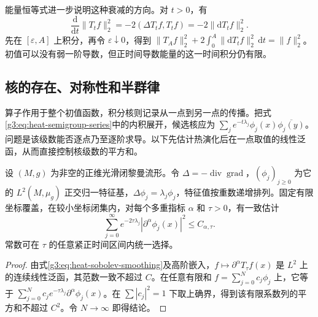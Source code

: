 能量恒等式进一步说明这种衰减的方向。对 \(t>0\)，有
\begin{equation}\label{g3:eq:heat-energy-dissipation}
	\frac{\mathrm d}{\mathrm dt}\|T_tf\|_2^2
	=-2(\Delta T_tf,T_tf)=-2\|\mathrm dT_tf\|_2^2.
\end{equation}
先在 \([\varepsilon,A]\) 上积分，再令 \(\varepsilon\downarrow0\)，得到 \(\|T_Af\|_2^2+2\int_0^A\|\mathrm dT_tf\|_2^2\,\mathrm dt=\|f\|_2^2\)。初值可以没有弱一阶导数，但正时间导数能量的这一时间积分仍有限。

\subsection{核的存在、对称性和半群律}
\label{g3:subsec:1601:03}

算子作用于整个初值函数，积分核则记录从一点到另一点的传播。把式\eqref{g3:eq:heat-semigroup-series}中的内积展开，候选核应为 \(\sum_j e^{-t\lambda_j}\phi_j(x)\overline{\phi_j(y)}\)。问题是该级数能否逐点乃至逐阶求导。以下先估计热演化后在一点取值的线性泛函，从而直接控制核级数的平方和。

\begin{lemma}\label{g3:lem:heat-evaluation-square-sum}
	设 \((M,g)\) 为非空的正维光滑闭黎曼流形。令 \(\Delta=-\operatorname{div}\operatorname{grad}\)，\((\phi_j)_{j\ge0}\) 为它的 \(L^2(M,\mu_g)\) 正交归一特征基，\(\Delta\phi_j=\lambda_j\phi_j\)，特征值按重数递增排列。固定有限坐标覆盖，在较小坐标闭集内，对每个多重指标 \(\alpha\) 和 \(\tau>0\)，有一致估计
	\[
		\sum_{j=0}^\infty e^{-2\tau\lambda_j}
		|\partial^\alpha\phi_j(x)|^2\le C_{\alpha,\tau}.
	\]
	常数可在 \(\tau\) 的任意紧正时间区间内统一选择。
\end{lemma}
\begin{proof}
	由式\eqref{g3:eq:heat-sobolev-smoothing}及高阶嵌入，\(f\mapsto\partial^\alpha T_\tau f(x)\) 是 \(L^2\) 上的连续线性泛函，其范数一致不超过 \(C\)。在任意有限和 \(f=\sum_{j=0}^N c_j\phi_j\) 上，它等于 \(\sum_{j=0}^N c_j e^{-\tau\lambda_j}\partial^\alpha\phi_j(x)\)。在 \(\sum|c_j|^2=1\) 下取上确界，得到该有限系数列的平方和不超过 \(C^2\)。令 \(N\to\infty\) 即得结论。
\end{proof}


